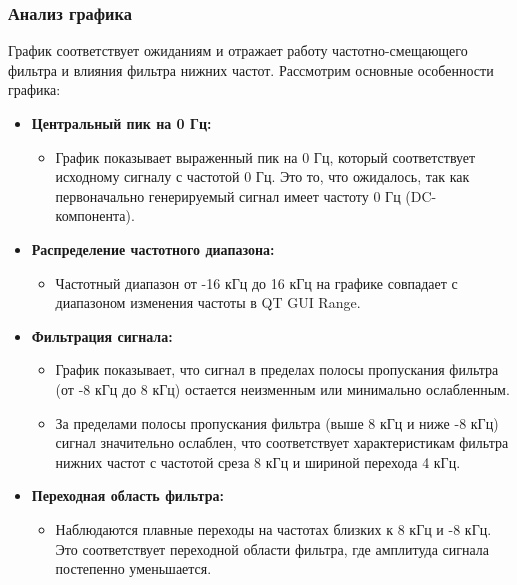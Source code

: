 \documentclass[a4paper,12pt]{extarticle}
\begin{document}
\subsubsection{Анализ графика}

\hspace{1.15cm}График соответствует ожиданиям и отражает работу частотно-смещающего фильтра и влияния фильтра 
нижних частот. Рассмотрим основные особенности графика:

\begin{itemize}
    \item \textbf{Центральный пик на 0 Гц:}
    \begin{itemize}
        \item График показывает выраженный пик на 0 Гц, который соответствует исходному сигналу с частотой 0 Гц. Это то, что ожидалось, так как первоначально генерируемый сигнал имеет частоту 0 Гц (DC-компонента).
    \end{itemize}
    
    \item \textbf{Распределение частотного диапазона:}
    \begin{itemize}
        \item Частотный диапазон от -16 кГц до 16 кГц на графике совпадает с диапазоном изменения частоты в QT GUI Range.
    \end{itemize}
    
    \item \textbf{Фильтрация сигнала:}
    \begin{itemize}
        \item График показывает, что сигнал в пределах полосы пропускания фильтра (от -8 кГц до 8 кГц) остается неизменным или минимально ослабленным.
        \item За пределами полосы пропускания фильтра (выше 8 кГц и ниже -8 кГц) сигнал значительно ослаблен, что соответствует характеристикам фильтра нижних частот с частотой среза 8 кГц и шириной перехода 4 кГц.
    \end{itemize}
    
    \item \textbf{Переходная область фильтра:}
    \begin{itemize}
        \item Наблюдаются плавные переходы на частотах близких к 8 кГц и -8 кГц. Это соответствует переходной области фильтра, где амплитуда сигнала постепенно уменьшается.
    \end{itemize}
    
\end{itemize}
\end{document}
